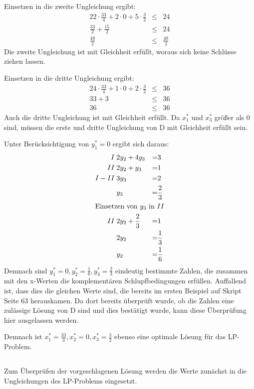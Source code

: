\documentclass[10pt,a4paper,oneside,ngerman,numbers=noenddot]{scrartcl}
\begin{document}
		Einsetzen in die zweite Ungleichung ergibt:
		\begin{alignat*}{2}
			2 \cdot \frac{33}{4} + 2 \cdot 0 + 5 \cdot \frac{3}{2} &\leq & 24 \\
			\frac{33}{2} + \frac{15}{2} &\leq & 24 \\
			\frac{48}{2} &\leq & \frac{48}{2}
		\end{alignat*}
		Die zweite Ungleichung ist mit Gleichheit erfüllt, woraus sich keine Schlüsse ziehen lassen.
		
		Einsetzen in die dritte Ungleichung ergibt:
		\begin{alignat*}{2}
			4 \cdot \frac{33}{4} + 1 \cdot 0 + 2 \cdot \frac{3}{2} &\leq & 36 \\
			33 + 3 &\leq & 36 \\
			36 &\leq & 36
		\end{alignat*}
		Auch die dritte Ungleichung ist mit Gleichheit erfüllt. Da $x_{1}^{*}$ und $x_{3}^{*}$ größer als $0$ sind, müssen die erste und dritte Ungleichung von D mit Gleichheit erfüllt sein.
		
		Unter Berücksichtigung von $y_{1}^{*} = 0$ ergibt sich daraus:
		\begin{alignat*}{2}
			I \;& 2y_{2} + 4y_{3} &=& 3 \\
			II \;& 2y_{2} + y_{3} &=& 1 \\
			I - II \;& 3y_{3} &=& 2 \\
			& y_{3} &=& \frac{2}{3} \\
			\intertext{Einsetzen von $y_{3}$ in $II$}
			II \;& 2y_{2} + \frac{2}{3} &=& 1 \\
			& 2y_{2} &=& \frac{1}{3} \\
			& y_{2} &=& \frac{1}{6}
		\end{alignat*}
		Demnach sind $y_{1}^{*} = 0, y_{2}^{*} = \frac{1}{6}, y_{3}^{*} = \frac{2}{3}$ eindeutig bestimmte Zahlen, die zusammen mit den x-Werten die komplementären Schlupfbedingungen erfüllen. Auffallend ist, dass dies die gleichen Werte sind, die bereits im ersten Beispiel auf Skript Seite 63 herauskamen. Da dort bereits überprüft wurde, ob die Zahlen eine zulässige Lösung von D sind und dies bestätigt wurde, kann diese Überprüfung hier ausgelassen werden.
		
		Demnach ist $x_{1}^{*} = \frac{33}{4}, x_{2}^{*} = 0, x_{3}^{*} = \frac{3}{2}$ ebenso eine optimale Lösung für das LP-Problem.
	\subsection{} %
		Zum Überprüfen der vorgeschlagenen Lösung werden die Werte zunächst in die Ungleichungen des LP-Problems eingesetzt.
		
\end{document}
